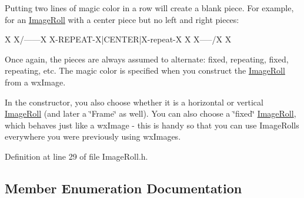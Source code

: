 Putting two lines of magic color in a row will create a blank piece. For example, for an \hyperlink{class_image_roll}{Image\+Roll} with a center piece but no left and right pieces\+:

\begin{DoxyVerb}  X        X/------\X        X
  X-REPEAT-X|CENTER|X-repeat-X
  X        X\------/X        X
\end{DoxyVerb}


Once again, the pieces are always assumed to alternate\+: fixed, repeating, fixed, repeating, etc. The magic color is specified when you construct the \hyperlink{class_image_roll}{Image\+Roll} from a wx\+Image.

In the constructor, you also choose whether it is a horizontal or vertical \hyperlink{class_image_roll}{Image\+Roll} (and later a \char`\"{}\+Frame\char`\"{} as well). You can also choose a \char`\"{}fixed\char`\"{} \hyperlink{class_image_roll}{Image\+Roll}, which behaves just like a wx\+Image -\/ this is handy so that you can use Image\+Rolls everywhere you were previously using wx\+Images. 

Definition at line 29 of file Image\+Roll.\+h.



\subsection{Member Enumeration Documentation}
